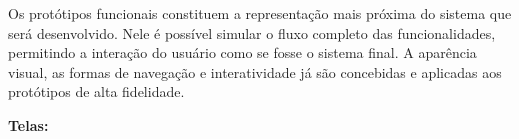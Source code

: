 Os protótipos funcionais constituem a representação mais próxima do sistema que será desenvolvido. Nele é possível simular o fluxo completo das funcionalidades, permitindo a interação do usuário como se fosse o sistema final. A aparência visual, as formas de navegação e interatividade já são concebidas e aplicadas aos protótipos de alta fidelidade.

\textbf{Telas:}

\begin{figure}[H]
\end{figure}

\begin{figure}[H]
\end{figure}

